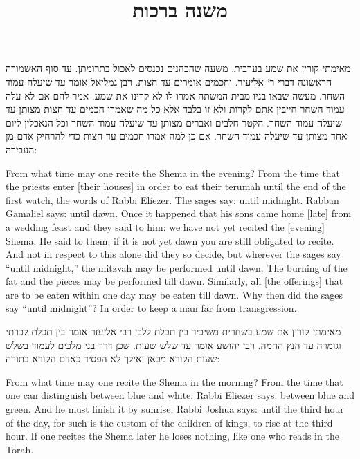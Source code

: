 \documentclass[12pt, openany]{book}
\newcommand{\textblock}[2]{
	{\fontsize{16pt}{20pt}\selectfont #1\\}
	
	\begin{english}
		#2
	\end{english}
	\clearpage
}
\begin{document}
\frontmatter
{}

\title{משנה ברכות}

\author{}

\date{}

\maketitle

\tableofcontents

\clearpage
\mainmatter
{}

\textblock{מאימתי קורין את שמע בערבית. משעה שהכהנים נכנסים לאכול בתרומתן. עד סוף האשמורה הראשונה דברי ר' אליעזר. וחכמים אומרים עד חצות. רבן גמליאל אומר עד שיעלה עמוד השחר. מעשה שבאו בניו מבית המשתה אמרו לו לא קרינו את שמע. אמר להם אם לא עלה עמוד השחר חייבין אתם לקרות ולא זו בלבד אלא כל מה שאמרו חכמים עד חצות מצותן עד שיעלה עמוד השחר. הקטר חלבים ואברים מצותן עד שיעלה עמוד השחר וכל הנאכלין ליום אחד מצותן עד שיעלה עמוד השחר. אם כן למה אמרו חכמים עד חצות כדי להרחיק אדם מן העבירה: }{From what time may one recite the Shema in the evening? From the time that the priests enter {[their houses]} in order to eat their terumah until the end of the first watch, the words of Rabbi Eliezer. The sages say: until midnight. Rabban Gamaliel says: until dawn. Once it happened that his sons came home {[late]} from a wedding feast and they said to him: we have not yet recited the {[evening]} Shema. He said to them: if it is not yet dawn you are still obligated to recite. And not in respect to this alone did they so decide, but wherever the sages say “until midnight,” the mitzvah may be performed until dawn. The burning of the fat and the pieces may be performed till dawn. Similarly, all {[the offerings]} that are to be eaten within one day may be eaten till dawn. Why then did the sages say “until midnight”?  In order to keep a man far from transgression.}
\textblock{מאימתי קורין את שמע בשחרית משיכיר בין תכלת ללבן רבי אליעזר אומר בין תכלת לכרתי וגומרה עד הנץ החמה. רבי יהושע אומר עד שלש שעות. שכן דרך בני מלכים לעמוד בשלש שעות הקורא מכאן ואילך לא הפסיד כאדם הקורא בתורה: }{From what time may one recite the Shema in the morning? From the time that one can distinguish between blue and white. Rabbi Eliezer says: between blue and green. And he must finish it by sunrise. Rabbi Joshua says: until the third hour of the day, for such is the custom of the children of kings, to rise at the third hour. If one recites the Shema later he loses nothing, like one who reads in the Torah.}
\end{document}

